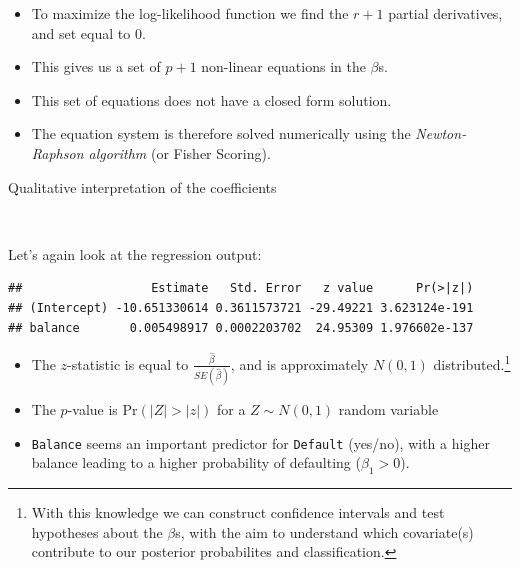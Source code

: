 \documentclass[10pt,ignorenonframetext,]{beamer}
\newenvironment{Shaded}{\begin{snugshade}}{\end{snugshade}}
\newcommand{\KeywordTok}[1]{\textcolor[rgb]{0.13,0.29,0.53}{\textbf{#1}}}
\newcommand{\OperatorTok}[1]{\textcolor[rgb]{0.81,0.36,0.00}{\textbf{#1}}}
\newcommand{\NormalTok}[1]{#1}
\begin{document}
\begin{frame}

\begin{itemize}
\item
  To maximize the log-likelihood function we find the \(r+1\) partial
  derivatives, and set equal to 0.
\item
  This gives us a set of \(p+1\) non-linear equations in the \(\beta\)s.
\item
  This set of equations does not have a closed form solution.
\item
  The equation system is therefore solved numerically using the
  \emph{Newton-Raphson algorithm} (or Fisher Scoring).
\end{itemize}

\end{frame}

\begin{frame}[fragile]

\begin{block}{Qualitative interpretation of the coefficients}

\(~\)

Let's again look at the regression output:

\scriptsize

\begin{Shaded}
\end{Shaded}

\begin{verbatim}
##                  Estimate   Std. Error   z value      Pr(>|z|)
## (Intercept) -10.651330614 0.3611573721 -29.49221 3.623124e-191
## balance       0.005498917 0.0002203702  24.95309 1.976602e-137
\end{verbatim}

\normalsize

\begin{itemize}
\item
  The \(z\)-statistic is equal to \(\frac{\hat\beta}{SE(\hat\beta)}\),
  and is approximately \(N(0,1)\)
  distributed.\footnote{With this knowledge we can construct confidence intervals and test hypotheses about the $\beta$s, with the aim to understand which covariate(s) contribute to our posterior probabilites and classification.}
\item
  The \(p\)-value is \(\text{Pr}(|Z| > |z|)\) for a \(Z\sim N(0,1)\)
  random variable
\item
  \texttt{Balance} seems an important predictor for \texttt{Default}
  (yes/no), with a higher balance leading to a higher probability of
  defaulting (\(\beta_1>0\)).
\end{itemize}

\end{block}

\end{frame}
\end{document}
